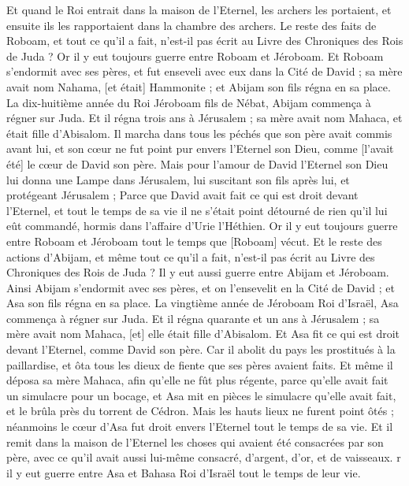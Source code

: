 \begin{multicols}{2}
Et quand le Roi entrait dans la maison de l'Eternel, les archers les portaient, et ensuite ils les rapportaient dans la chambre des archers.
Le reste des faits de Roboam, et tout ce qu'il a fait, n'est-il pas écrit au Livre des Chroniques des Rois de Juda ?
Or il y eut toujours guerre entre Roboam et Jéroboam.
Et Roboam s'endormit avec ses pères, et fut enseveli avec eux dans la Cité de David ; sa mère avait nom Nahama, [et était] Hammonite ; et Abijam son fils régna en sa place.
\VerseOne{}La dix-huitième année du Roi Jéroboam fils de Nébat, Abijam commença à régner sur Juda.
Et il régna trois ans à Jérusalem ; sa mère avait nom Mahaca, et était fille d'Abisalom.
Il marcha dans tous les péchés que son père avait commis avant lui, et son cœur ne fut point pur envers l'Eternel son Dieu, comme [l'avait été] le cœur de David son père.
Mais pour l'amour de David l'Eternel son Dieu lui donna une Lampe dans Jérusalem, lui suscitant son fils après lui, et protégeant Jérusalem ;
Parce que David avait fait ce qui est droit devant l'Eternel, et tout le temps de sa vie il ne s'était point détourné de rien qu'il lui eût commandé, hormis dans l'affaire d'Urie l'Héthien.
Or il y eut toujours guerre entre Roboam et Jéroboam tout le temps que [Roboam] vécut.
Et le reste des actions d'Abijam, et même tout ce qu'il a fait, n'est-il pas écrit au Livre des Chroniques des Rois de Juda ? Il y eut aussi guerre entre Abijam et Jéroboam.
Ainsi Abijam s'endormit avec ses pères, et on l'ensevelit en la Cité de David ; et Asa son fils régna en sa place.
La vingtième année de Jéroboam Roi d'Israël, Asa commença à régner sur Juda.
Et il régna quarante et un ans à Jérusalem ; sa mère avait nom Mahaca, [et] elle était fille d'Abisalom.
Et Asa fit ce qui est droit devant l'Eternel, comme David son père.
Car il abolit du pays les prostitués à la paillardise, et ôta tous les dieux de fiente que ses pères avaient faits.
Et même il déposa sa mère Mahaca, afin qu'elle ne fût plus régente, parce qu'elle avait fait un simulacre pour un bocage, et Asa mit en pièces le simulacre qu'elle avait fait, et le brûla près du torrent de Cédron.
Mais les hauts lieux ne furent point ôtés ; néanmoins le cœur d'Asa fut droit envers l'Eternel tout le temps de sa vie.
Et il remit dans la maison de l'Eternel les choses qui avaient été consacrées par son père, avec ce qu'il avait aussi lui-même consacré, d'argent, d'or, et de vaisseaux.
r il y eut guerre entre Asa et Bahasa Roi d'Israël tout le temps de leur vie.

\end{multicols}

